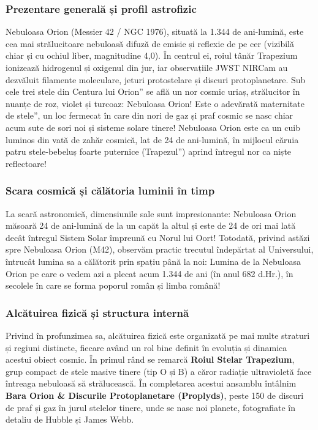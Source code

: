\subsubsection*{Prezentare generală și profil astrofizic}
Nebuloasa Orion (Messier 42 / NGC 1976), situată la 1.344 de ani-lumină, este cea mai strălucitoare nebuloasă difuză de emisie și reflexie de pe cer (vizibilă chiar și cu ochiul liber, magnitudine 4,0). În centrul ei, roiul tânăr Trapezium ionizează hidrogenul și oxigenul din jur, iar observațiile JWST NIRCam au dezvăluit filamente moleculare, jeturi protostelare și discuri protoplanetare. Sub cele trei stele din \quotedblbase{}Centura lui Orion\textquotedblright{} se află un nor cosmic uriaș, strălucitor în nuanțe de roz, violet și turcoaz: Nebuloasa Orion! Este o adevărată \quotedblbase{}maternitate de stele\textquotedblright{}, un loc fermecat în care din nori de gaz și praf cosmic se nasc chiar acum sute de sori noi și sisteme solare tinere! Nebuloasa Orion este ca un cuib luminos din vată de zahăr cosmică, lat de 24 de ani-lumină, în mijlocul căruia patru stele-bebeluș foarte puternice (\quotedblbase{}Trapezul\textquotedblright{}) aprind întregul nor ca niște reflectoare!

\subsubsection*{Scara cosmică și călătoria luminii în timp}
La scară astronomică, dimensiunile sale sunt impresionante: Nebuloasa Orion măsoară 24 de ani-lumină de la un capăt la altul și este de 24 de ori mai lată decât întregul Sistem Solar împreună cu Norul lui Oort! Totodată, privind astăzi spre Nebuloasa Orion (M42), observăm practic trecutul îndepărtat al Universului, întrucât lumina sa a călătorit prin spațiu până la noi: Lumina de la Nebuloasa Orion pe care o vedem azi a plecat acum 1.344 de ani (în anul 682 d.Hr.), în secolele în care se forma poporul român și limba română!

\subsubsection*{Alcătuirea fizică și structura internă}
Privind în profunzimea sa, alcătuirea fizică este organizată pe mai multe straturi și regiuni distincte, fiecare având un rol bine definit în evoluția și dinamica acestui obiect cosmic. În primul rând se remarcă \textbf{Roiul Stelar Trapezium}, grup compact de stele masive tinere (tip O și B) a căror radiație ultravioletă face întreaga nebuloasă să strălucească. În completarea acestui ansamblu întâlnim \textbf{Bara Orion \& Discurile Protoplanetare (Proplyds)}, peste 150 de discuri de praf și gaz în jurul stelelor tinere, unde se nasc noi planete, fotografiate în detaliu de Hubble și James Webb.

